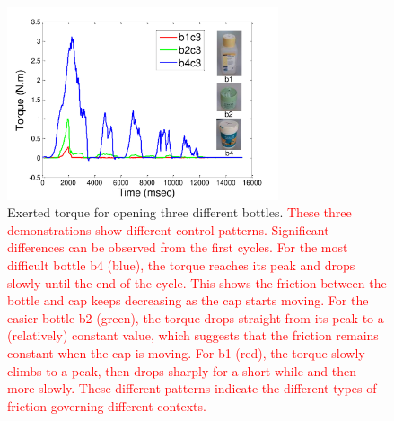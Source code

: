 \begin{figure}
  \centering
  \includegraphics[width=8cm]{./fig/b1b2b4_time_T.pdf}
  \caption{ \scriptsize{Exerted torque for opening three different
      bottles. \textcolor{red}{These three demonstrations show
        different control patterns. Significant differences can be
        observed from the first cycles. For the most difficult bottle
        b4 (blue), the torque reaches its peak and drops slowly until
        the end of the cycle. This shows the friction between the
        bottle and cap keeps decreasing as the cap starts moving. For
        the easier bottle b2 (green), the torque drops straight from
        its peak to a (relatively) constant value, which suggests that
        the friction remains constant when the cap is moving. For 
        b1 (red), the torque slowly climbs to a peak, then drops sharply
        for a short while and then more slowly. These different
        patterns indicate the different types of friction governing
        different contexts.}}  }
\label{fig:bottlepatterns}
\end{figure}


